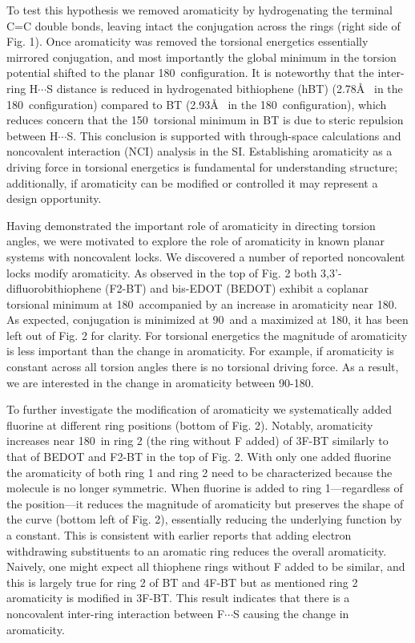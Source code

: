 To test this hypothesis we removed aromaticity by hydrogenating the terminal C=C double bonds, leaving intact the conjugation across the rings (right side of Fig. 1). Once aromaticity was removed the torsional energetics essentially mirrored conjugation, and most importantly the global minimum in the torsion potential shifted to the planar 180\textdegree \ configuration. It is noteworthy that the inter-ring H$\cdots$S distance is reduced in hydrogenated bithiophene (hBT) (2.78\si{\angstrom} \ in the 180\textdegree \ configuration) compared to BT (2.93\si{\angstrom} \ in the 180\textdegree \ configuration), which reduces concern that the 150\textdegree \ torsional minimum in BT is due to steric repulsion between H$\cdots$S. This conclusion is supported with through-space calculations and noncovalent interaction (NCI) analysis\cite{Johnson2010, Contreras-Garcia2011} in the SI. Establishing aromaticity as a driving force in torsional energetics is fundamental for understanding structure; additionally, if aromaticity can be modified or controlled it may represent a design opportunity.

Having demonstrated the important role of aromaticity in directing torsion angles, we were motivated to explore the role of aromaticity in known planar systems with noncovalent locks. We discovered a number of reported noncovalent locks modify aromaticity. As observed in the top of Fig. 2 both  3,3'-difluorobithiophene (F2-BT) and bis-EDOT (BEDOT) exhibit a coplanar torsional minimum at 180\textdegree \ accompanied by an increase in aromaticity near 180\textdegree. As expected, conjugation is minimized at 90\textdegree \ and a maximized at 180\textdegree, it has been left out of Fig. 2 for clarity. For torsional energetics the magnitude of aromaticity is less important than the change in aromaticity. For example, if aromaticity is constant across all torsion angles there is no torsional driving force. As a result, we are interested in the change in aromaticity between 90-180\textdegree. 

To further investigate the modification of aromaticity we systematically added fluorine at different ring positions (bottom of Fig. 2). Notably, aromaticity increases near 180\textdegree \ in ring 2 (the ring without F added) of 3F-BT similarly to that of BEDOT and F2-BT in the top of Fig. 2. With only one added fluorine the aromaticity of both ring 1 and ring 2 need to be characterized because the molecule is no longer symmetric. When fluorine is added to ring 1---regardless of the position---it reduces the magnitude of aromaticity but preserves the shape of the curve (bottom left of Fig. 2), essentially reducing the underlying function by a constant. This is consistent with earlier reports that adding electron withdrawing substituents to an aromatic ring reduces the overall aromaticity.\cite{Krygowski2014} Naively, one might expect all thiophene rings without F added to be similar, and this is largely true for ring 2 of BT and 4F-BT but as mentioned ring 2 aromaticity is modified in 3F-BT. This result indicates that there is a noncovalent inter-ring interaction between F$\cdots$S causing the change in aromaticity.

